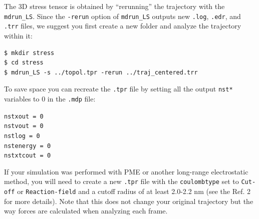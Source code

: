 \documentclass[10pt,letterpaper,notitlepage]{article}
\begin{document}
The 3D stress tensor is obtained by ``rerunning'' the trajectory with the \texttt{mdrun\_LS}. Since the \texttt{-rerun} option of \texttt{mdrun\_LS} outputs new \texttt{.log}, \texttt{.edr}, and \texttt{.trr} files, we suggest you first create a new folder and analyze the trajectory within it:
\begin{lstlisting}[caption=Computing the stress with \texttt{mdrun\_LS}]
$ mkdir stress
$ cd stress
$ mdrun_LS -s ../topol.tpr -rerun ../traj_centered.trr
\end{lstlisting}
To save space you can recreate the \texttt{.tpr} file by setting all the output \texttt{nst*} variables to 0 in the \texttt{.mdp} file:

\texttt{nstxout         = 0\\
nstvout         = 0\\
nstlog          = 0\\
nstenergy       = 0\\
nstxtcout       = 0\\
}

If your simulation was performed with PME or another long-range electrostatic method, you will need to create a new \texttt{.tpr} file with the \texttt{coulombtype} set to \texttt{Cut-off} or \texttt{Reaction-field} and a cutoff radius of at least 2.0-2.2 nm (see the Ref. 2 for more details). Note that this does not change your original trajectory but the way forces are calculated when analyzing each frame.
\end{document}

